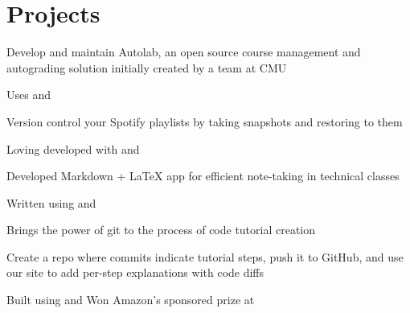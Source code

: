 \documentclass[hidelinks]{deedy-resume-openfont}
\begin{document}
\begin{minipage}[t]{0.66\textwidth}

\section{Projects}
\descript{}
\begin{tightemize}
\item Develop and maintain Autolab, an open source course management and
  autograding solution initially created by a team at CMU
\item Uses  and 
\end{tightemize}
\sectionsep

\descript{}
\begin{tightemize}
\item Version control your Spotify playlists by taking snapshots and restoring
  to them
\item Loving developed with  and 
\end{tightemize}
\sectionsep

\descript{}
\begin{tightemize}
\item Developed Markdown + \LaTeX{} app for efficient note-taking in technical
  classes
\item Written using  and 
\end{tightemize}
\sectionsep

\descript{}
\begin{tightemize}
\item Brings the power of git to the process of code tutorial creation
\item Create a repo where commits indicate tutorial steps, push it to GitHub,
  and use our site to add per-step explanations with code diffs
\item Built using  and  Won Amazon's
  sponsored prize at 
\end{tightemize}
\sectionsep


\end{minipage}
\end{document}
